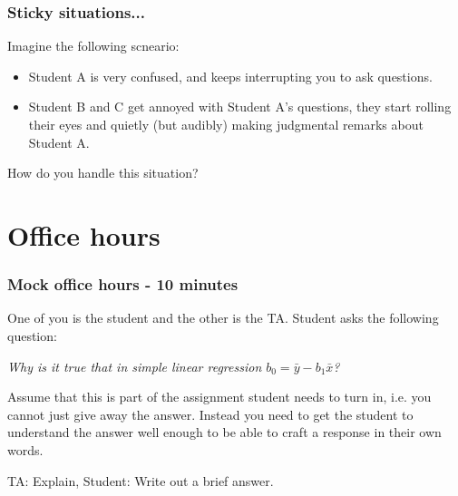 \documentclass{beamer}
\begin{document}

\begin{frame}
\frametitle{Sticky situations...}

Imagine the following scneario:

\begin{itemize}

\item Student A is very confused, and keeps interrupting you to ask questions.

\item Student B and C get annoyed with Student A's questions, they start rolling their eyes and quietly (but audibly) making judgmental remarks about Student A.

\end{itemize}

How do you handle this situation?

\end{frame}


\section{Office hours}


\begin{frame}
\frametitle{Mock office hours - 10 minutes}

One of you is the student and the other is the TA. Student asks the following question: 

\vfill

\textit{Why is it true that in simple linear regression $b_0 = \bar{y} - b_1 \bar{x}$?}

\vfill

Assume that this is part of the assignment student needs to turn in, i.e. you cannot just give away the answer. Instead you need to get the student to understand the answer well enough to be able to craft a response in their own words.

\vfill

TA: Explain, Student: Write out a brief answer.

\end{frame}

\end{document}
